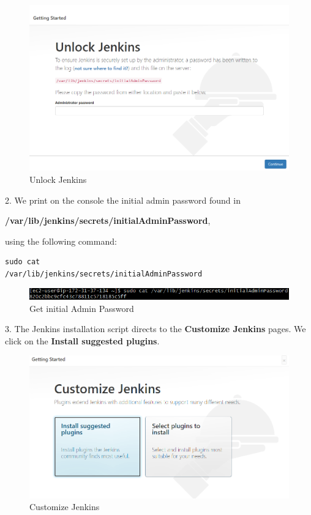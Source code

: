 \documentclass[12pt,a4paper,twoside]{article}
\begin{document}
\begin{figure}[H]
    \centering
        \includegraphics[width=15cm]{images-aws/20-unlock-jenkins.png}
        \caption{Unlock Jenkins}
\end{figure}


2. We print on the console the initial admin password found in

 \textbf{/var/lib/jenkins/secrets/initialAdminPassword}, 

using the following command:


\begin{verbatim}
sudo cat
/var/lib/jenkins/secrets/initialAdminPassword
\end{verbatim}


\begin{figure}[H]
    \centering
        \includegraphics[width=13cm]{images-aws/21-get-jenkins-admin-pass.png}
        \caption{Get initial Admin Password}
\end{figure}


3. The Jenkins installation script directs to the \textbf{Customize Jenkins} pages. We click on the  \textbf{Install suggested plugins}.


\begin{figure}[H]
    \centering
        \includegraphics[width=15cm]{images-aws/22-jenkins-select-plugin.png}
        \caption{Customize Jenkins}
\end{figure}
\end{document}
